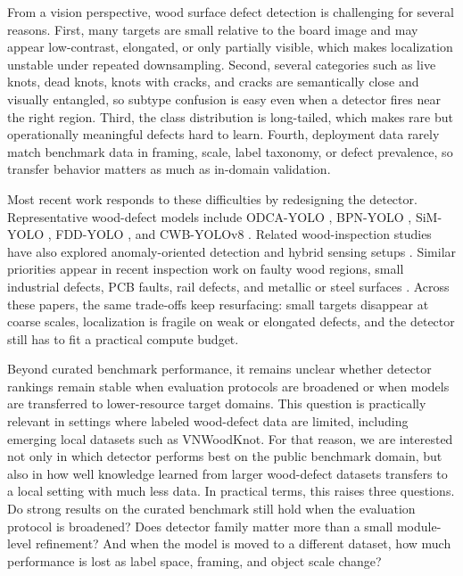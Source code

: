 \documentclass[10pt,a4paper]{article}
\begin{document}
From a vision perspective, wood surface defect detection is challenging for several reasons. First, many targets are small relative to the board image and may appear low-contrast, elongated, or only partially visible, which makes localization unstable under repeated downsampling. Second, several categories such as live knots, dead knots, knots with cracks, and cracks are semantically close and visually entangled, so subtype confusion is easy even when a detector fires near the right region. Third, the class distribution is long-tailed, which makes rare but operationally meaningful defects hard to learn. Fourth, deployment data rarely match benchmark data in framing, scale, label taxonomy, or defect prevalence, so transfer behavior matters as much as in-domain validation.

Most recent work responds to these difficulties by redesigning the detector. Representative wood-defect models include ODCA-YOLO \citep{odca_yolo}, BPN-YOLO \citep{bpn_yolo}, SiM-YOLO \citep{sim_yolo}, FDD-YOLO \citep{fdd_yolo}, and CWB-YOLOv8 \citep{an_cwb_yolov8}. Related wood-inspection studies have also explored anomaly-oriented detection and hybrid sensing setups \citep{kilic_2024,kilic_2025_wd_detector}. Similar priorities appear in recent inspection work on faulty wood regions, small industrial defects, PCB faults, rail defects, and metallic or steel surfaces \citep{cmc_wood_area_attention,cmc_insulator_small,cmc_pcb_yolov8,cmc_cg_yolov8,cmc_rail_upernet,cmc_yolo_rlc,cmc_lmvit,cmc_msese,cmc_flame,cmc_channel_shuffle}. Across these papers, the same trade-offs keep resurfacing: small targets disappear at coarse scales, localization is fragile on weak or elongated defects, and the detector still has to fit a practical compute budget.


Beyond curated benchmark performance, it remains unclear whether detector rankings remain stable when evaluation protocols are broadened or when models are transferred to lower-resource target domains. This question is practically relevant in settings where labeled wood-defect data are limited, including emerging local datasets such as VNWoodKnot. For that reason, we are interested not only in which detector performs best on the public benchmark domain, but also in how well knowledge learned from larger wood-defect datasets transfers to a local setting with much less data. In practical terms, this raises three questions. Do strong results on the curated benchmark still hold when the evaluation protocol is broadened? Does detector family matter more than a small module-level refinement? And when the model is moved to a different dataset, how much performance is lost as label space, framing, and object scale change?
\end{document}

